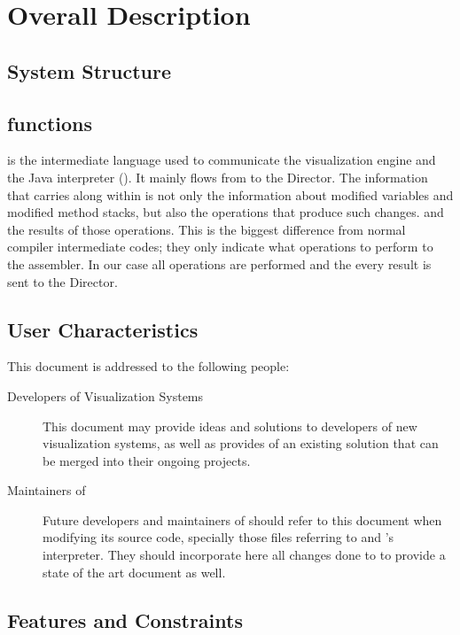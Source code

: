 \chapter{Overall Description}
\label{ch:overall}

\section{\jel{} System Structure}
\label{sec:structure}

\section{\mcode{} functions}
\label{sec:functions}
\mcode{} is the intermediate language used to communicate the visualization engine and the Java interpreter (\djava{}). It mainly flows from \djava{}to the Director.  The information that carries along within is not only the information about modified variables and modified method stacks, but also the operations that produce such changes. and the results of those operations. This is the biggest difference from normal compiler intermediate codes; they only indicate what operations to perform to the assembler. In our case all operations are performed and the every result is sent to the Director.

\section{User Characteristics}
\label{sec:users}

This document is addressed to the following people:

\begin{description}
	\item[Developers of Visualization Systems] This document may provide ideas and solutions to developers of new visualization systems, as well as provides of an existing solution that can be merged into their ongoing projects.
	
	\item[Maintainers of \jel{}] Future developers and maintainers of \jel{} should refer to this document when modifying its source code, specially those files referring to \djava{} and \jel{}'s interpreter. They should incorporate here all changes done to \mcode{} to provide a state of the art document as well. 
	
\end{description}

\section{Features and Constraints}
\label{sec:features}

